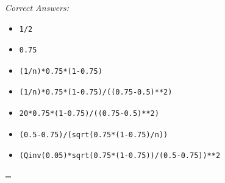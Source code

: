 \documentclass[10pt,dvips]{amsart}
\begin{document}
\par{\small{\it Correct Answers:}
\vspace{-\parskip}\begin{itemize}
\item\begin{verbatim}1/2\end{verbatim}
\item\begin{verbatim}0.75\end{verbatim}
\item\begin{verbatim}(1/n)*0.75*(1-0.75)\end{verbatim}
\item\begin{verbatim}(1/n)*0.75*(1-0.75)/((0.75-0.5)**2)\end{verbatim}
\item\begin{verbatim}20*0.75*(1-0.75)/((0.75-0.5)**2)\end{verbatim}
\item\begin{verbatim}(0.5-0.75)/(sqrt(0.75*(1-0.75)/n))\end{verbatim}
\item\begin{verbatim}(Qinv(0.05)*sqrt(0.75*(1-0.75))/(0.5-0.75))**2\end{verbatim}
\end{itemize}}\par



\columnwidth=\linewidth


% 
% 
\vfill
\end{document}
